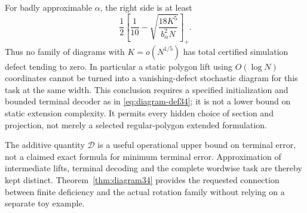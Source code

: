 For badly approximable $\alpha$, the right side is at least
\begin{equation}\label{eq:diagram-bad34}
 \frac12\left[\frac1{10}-\sqrt{\frac{18K^5}{b_\alpha^2N}}\right]_+.
\end{equation}
Thus no family of diagrams with $K=o(N^{1/5})$ has total certified
simulation defect tending to zero. In particular a static polygon lift
using $O(\log N)$ coordinates cannot be turned into a vanishing-defect
stochastic diagram for this task at the same width. This conclusion
requires a specified initialization and bounded terminal decoder as in
\eqref{eq:diagram-def34}; it is not a lower bound on static extension
complexity. It permits every hidden choice of section and projection,
not merely a selected regular-polygon extended formulation.

The additive quantity $\mathcal D$ is a useful operational upper bound on
terminal error, not a claimed exact formula for minimum terminal error.
Approximation of intermediate lifts, terminal decoding and the complete
wordwise task are thereby kept distinct. Theorem~\ref{thm:diagram34}
provides the requested connection between finite deficiency and the
actual rotation family without relying on a separate toy example.
